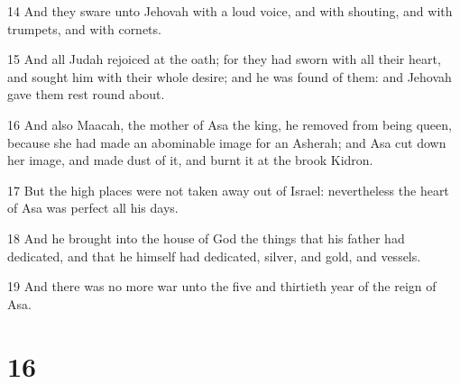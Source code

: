 \par 14 And they sware unto Jehovah with a loud voice, and with shouting, and with trumpets, and with cornets.
\par 15 And all Judah rejoiced at the oath; for they had sworn with all their heart, and sought him with their whole desire; and he was found of them: and Jehovah gave them rest round about.
\par 16 And also Maacah, the mother of Asa the king, he removed from being queen, because she had made an abominable image for an Asherah; and Asa cut down her image, and made dust of it, and burnt it at the brook Kidron.
\par 17 But the high places were not taken away out of Israel: nevertheless the heart of Asa was perfect all his days.
\par 18 And he brought into the house of God the things that his father had dedicated, and that he himself had dedicated, silver, and gold, and vessels.
\par 19 And there was no more war unto the five and thirtieth year of the reign of Asa.

\chapter{16}

